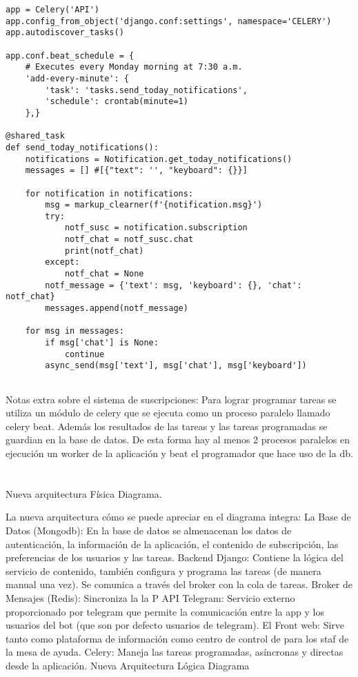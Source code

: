 \begin{lstlisting}
app = Celery('API')
app.config_from_object('django.conf:settings', namespace='CELERY')
app.autodiscover_tasks()

app.conf.beat_schedule = {
    # Executes every Monday morning at 7:30 a.m.
    'add-every-minute': {
        'task': 'tasks.send_today_notifications',
        'schedule': crontab(minute=1)
    },}

@shared_task
def send_today_notifications():
    notifications = Notification.get_today_notifications()
    messages = [] #[{"text": '', "keyboard": {}}]
    
    for notification in notifications:
        msg = markup_clearner(f'{notification.msg}')
        try:
            notf_susc = notification.subscription
            notf_chat = notf_susc.chat
            print(notf_chat)
        except:
            notf_chat = None
        notf_message = {'text': msg, 'keyboard': {}, 'chat': notf_chat}
        messages.append(notf_message)

    for msg in messages:
        if msg['chat'] is None:
            continue
        async_send(msg['text'], msg['chat'], msg['keyboard'])


\end{lstlisting}

Notas extra sobre el sistema de suscripciones:
Para lograr programar tareas se utiliza un módulo de celery que se ejecuta como un proceso paralelo llamado celery beat. Además los resultados de las tareas y las tareas programadas se guardian en la base de datos. De esta forma hay al menos 2 procesos paralelos en ejecución un worker de la aplicación y beat el programador que hace uso de la db.
\section{}
Nueva arquitectura Física
Diagrama.


La nueva arquitectura cómo se puede apreciar en el diagrama integra:
La Base de Datos (Mongodb):  En la base de datos se almenacenan los datos de autenticación, la información de la aplicación, el contenido de subscripción, las preferencias de los usuarios y las tareas.
Backend Django: Contiene la lógica del servicio de contenido, también configura y programa las tareas (de manera manual una vez). Se comunica a través del broker con la cola de tareas.
Broker de Mensajes (Redis): Sincroniza la la P
API Telegram: Servicio externo proporcionado por telegram que permite la comunicación entre la app y los usuarios del bot (que son por defecto usuarios de telegram).
El Front web: Sirve tanto como plataforma de información como centro de control de para los staf de la mesa de ayuda.
Celery: Maneja las tareas programadas, asíncronas y directas desde la aplicación.
Nueva Arquitectura Lógica
Diagrama

